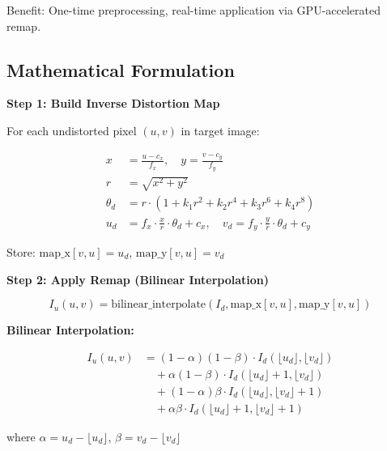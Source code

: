 \documentclass[11pt,a4paper,oneside]{article}
\begin{document}
Benefit: One-time preprocessing, real-time application via GPU-accelerated remap.

\subsection{Mathematical Formulation}

\textbf{Step 1: Build Inverse Distortion Map}

For each undistorted pixel $(u, v)$ in target image:

\begin{align}
x &= \frac{u - c_x}{f_x}, \quad y = \frac{v - c_y}{f_y} \label{eq:normalize} \\
r &= \sqrt{x^2 + y^2} \label{eq:radius} \\
\theta_d &= r \cdot (1 + k_1 r^2 + k_2 r^4 + k_3 r^6 + k_4 r^8) \label{eq:apply_distortion} \\
u_d &= f_x \cdot \frac{x}{r} \cdot \theta_d + c_x, \quad v_d = f_y \cdot \frac{y}{r} \cdot \theta_d + c_y \label{eq:denormalize}
\end{align}

Store: $\text{map\_x}[v, u] = u_d$, $\text{map\_y}[v, u] = v_d$

\textbf{Step 2: Apply Remap (Bilinear Interpolation)}

\begin{equation}
I_u(u, v) = \text{bilinear\_interpolate}(I_d, \text{map\_x}[v, u], \text{map\_y}[v, u])
\label{eq:remap_apply}
\end{equation}

\textbf{Bilinear Interpolation:}

\begin{align}
I_u(u, v) &= (1-\alpha)(1-\beta) \cdot I_d(\lfloor u_d \rfloor, \lfloor v_d \rfloor) \nonumber \\
&\quad + \alpha(1-\beta) \cdot I_d(\lfloor u_d \rfloor+1, \lfloor v_d \rfloor) \\
&\quad + (1-\alpha)\beta \cdot I_d(\lfloor u_d \rfloor, \lfloor v_d \rfloor+1) \\
&\quad + \alpha\beta \cdot I_d(\lfloor u_d \rfloor+1, \lfloor v_d \rfloor+1)
\label{eq:bilinear}
\end{align}

where $\alpha = u_d - \lfloor u_d \rfloor$, $\beta = v_d - \lfloor v_d \rfloor$

\end{document}
